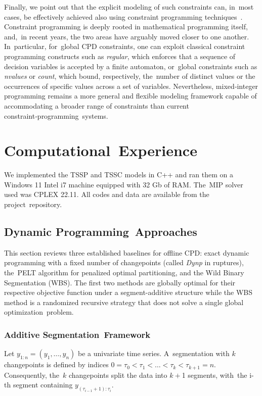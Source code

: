 \documentclass[mathematics,article,accept,pdftex,moreauthors]{Definitions/mdpi}
\begin{document}
Finally, we point out that the explicit modeling of such constraints can, in~most cases, be effectively achieved also using constraint programming techniques \cite{RBW06}. Constraint programming is deeply rooted in mathematical programming itself, and,~in recent years, the two areas have arguably moved closer to one another. In~particular, for~global CPD constraints, one can exploit classical constraint programming constructs such as {\it regular}, which enforces that a sequence of decision variables is accepted by a finite automaton, or~global constraints such as {\it nvalues} or {\it count}, which bound, respectively, the~number of distinct values or the occurrences of specific values across a set of variables. Nevertheless, mixed‑integer programming remains a more general and flexible modeling framework capable of accommodating a broader range of constraints than current constraint‑programming~systems.

\section{Computational~Experience} 			\label{sec:computation}

We implemented the TSSP and TSSC models in C++ and ran them on a Windows 11 Intel i7 machine equipped with 32 Gb of RAM. The~MIP solver used was CPLEX 22.11. All codes and data are available from the project~repository.

\subsection{Dynamic Programming~Approaches} \label{subsec:DPcodes}

This section reviews three established baselines for offline CPD: exact dynamic programming with a fixed number of changepoints (called {\it Dynp} in ruptures), the~PELT algorithm for penalized optimal partitioning, and the Wild Binary Segmentation (WBS).
The first two methods are globally optimal for their respective objective function under a segment-additive structure while the WBS method is a randomized recursive strategy that does not solve a single global optimization~problem.

\subsubsection{Additive Segmentation~Framework}

Let $y_{1:n} = (y_1,\dots,y_n)$ be a univariate time series. A~segmentation with $k$ changepoints is defined by indices
$0 = \tau_0 < \tau_1 < \dots < \tau_k < \tau_{k+1} = n$.
Consequently, the~$k$ changepoints split the data into $k + $1 segments, with~the i-th segment containing $y_{(\tau_{i-1}+1):\tau_i}$.
\end{document}
